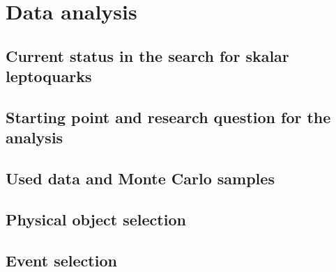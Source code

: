 \chapter{Data analysis}
\section{Current status in the search for skalar leptoquarks}
\section{Starting point and research question for the analysis}
\section{Used data and Monte Carlo samples}
\section{Physical object selection}
\section{Event selection}
